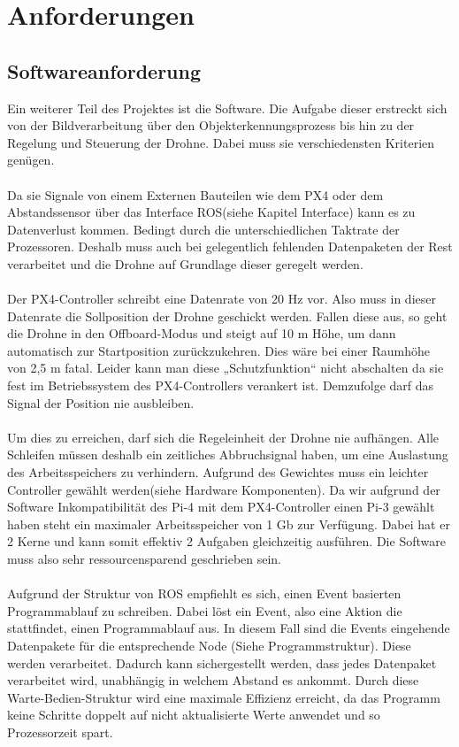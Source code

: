 \section{Anforderungen}
\subsection{Softwareanforderung}
Ein weiterer Teil des Projektes ist die Software. Die Aufgabe dieser erstreckt sich von der Bildverarbeitung über den Objekterkennungsprozess bis hin zu der Regelung und Steuerung der Drohne. Dabei muss sie verschiedensten Kriterien genügen.\\
\\
Da sie Signale von einem Externen Bauteilen wie dem PX4 oder dem Abstandssensor über das Interface ROS(siehe Kapitel Interface) kann es zu Datenverlust kommen. Bedingt durch die unterschiedlichen Taktrate der Prozessoren. Deshalb muss auch bei gelegentlich fehlenden Datenpaketen der Rest verarbeitet und die Drohne auf Grundlage dieser geregelt werden.\\
\\
Der PX4-Controller schreibt eine Datenrate von 20 Hz vor. Also muss in dieser Datenrate die Sollposition der Drohne geschickt werden. Fallen diese aus, so geht die Drohne in den Offboard-Modus und steigt auf 10 m Höhe, um dann automatisch zur Startposition zurückzukehren. Dies wäre bei einer Raumhöhe von 2,5 m fatal. Leider kann man diese „Schutzfunktion“ nicht abschalten da sie fest im Betriebssystem des PX4-Controllers verankert ist. Demzufolge darf das Signal der Position nie ausbleiben.\\
\\
Um dies zu erreichen, darf sich die Regeleinheit der Drohne nie aufhängen. Alle Schleifen müssen deshalb ein zeitliches Abbruchsignal haben, um eine Auslastung des Arbeitsspeichers zu verhindern. Aufgrund des Gewichtes muss ein leichter Controller gewählt werden(siehe Hardware Komponenten). Da wir aufgrund der Software Inkompatibilität des Pi-4 mit dem PX4-Controller einen Pi-3 gewählt haben steht ein maximaler Arbeitsspeicher von 1 Gb zur Verfügung. Dabei hat er 2 Kerne und kann somit effektiv 2 Aufgaben gleichzeitig ausführen. Die Software muss also sehr ressourcensparend geschrieben sein.\\
\\
Aufgrund der Struktur von ROS empfiehlt es sich, einen Event basierten Programmablauf zu schreiben. Dabei löst ein Event, also eine Aktion die stattfindet, einen Programmablauf aus. In diesem Fall sind die Events eingehende Datenpakete für die entsprechende Node (Siehe Programmstruktur). Diese werden verarbeitet. Dadurch kann sichergestellt werden, dass jedes Datenpaket verarbeitet wird, unabhängig in welchem Abstand es ankommt. Durch diese Warte-Bedien-Struktur wird eine maximale Effizienz erreicht, da das Programm keine Schritte doppelt auf nicht aktualisierte Werte anwendet und so Prozessorzeit spart.